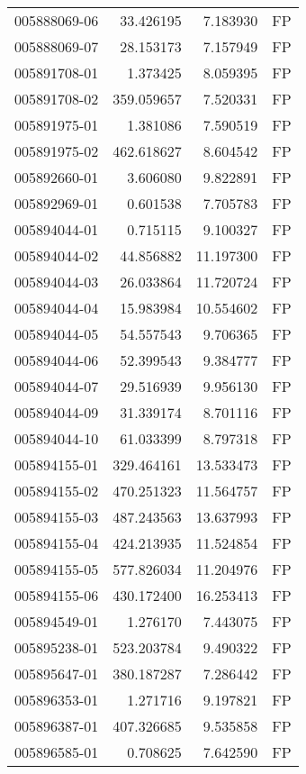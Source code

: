 \begin{tabular}{lrrl}
005888069-06 &   33.426195 &     7.183930 &   FP \\
005888069-07 &   28.153173 &     7.157949 &   FP \\
005891708-01 &    1.373425 &     8.059395 &   FP \\
005891708-02 &  359.059657 &     7.520331 &   FP \\
005891975-01 &    1.381086 &     7.590519 &   FP \\
005891975-02 &  462.618627 &     8.604542 &   FP \\
005892660-01 &    3.606080 &     9.822891 &   FP \\
005892969-01 &    0.601538 &     7.705783 &   FP \\
005894044-01 &    0.715115 &     9.100327 &   FP \\
005894044-02 &   44.856882 &    11.197300 &   FP \\
005894044-03 &   26.033864 &    11.720724 &   FP \\
005894044-04 &   15.983984 &    10.554602 &   FP \\
005894044-05 &   54.557543 &     9.706365 &   FP \\
005894044-06 &   52.399543 &     9.384777 &   FP \\
005894044-07 &   29.516939 &     9.956130 &   FP \\
005894044-09 &   31.339174 &     8.701116 &   FP \\
005894044-10 &   61.033399 &     8.797318 &   FP \\
005894155-01 &  329.464161 &    13.533473 &   FP \\
005894155-02 &  470.251323 &    11.564757 &   FP \\
005894155-03 &  487.243563 &    13.637993 &   FP \\
005894155-04 &  424.213935 &    11.524854 &   FP \\
005894155-05 &  577.826034 &    11.204976 &   FP \\
005894155-06 &  430.172400 &    16.253413 &   FP \\
005894549-01 &    1.276170 &     7.443075 &   FP \\
005895238-01 &  523.203784 &     9.490322 &   FP \\
005895647-01 &  380.187287 &     7.286442 &   FP \\
005896353-01 &    1.271716 &     9.197821 &   FP \\
005896387-01 &  407.326685 &     9.535858 &   FP \\
005896585-01 &    0.708625 &     7.642590 &   FP \\

\end{tabular}
